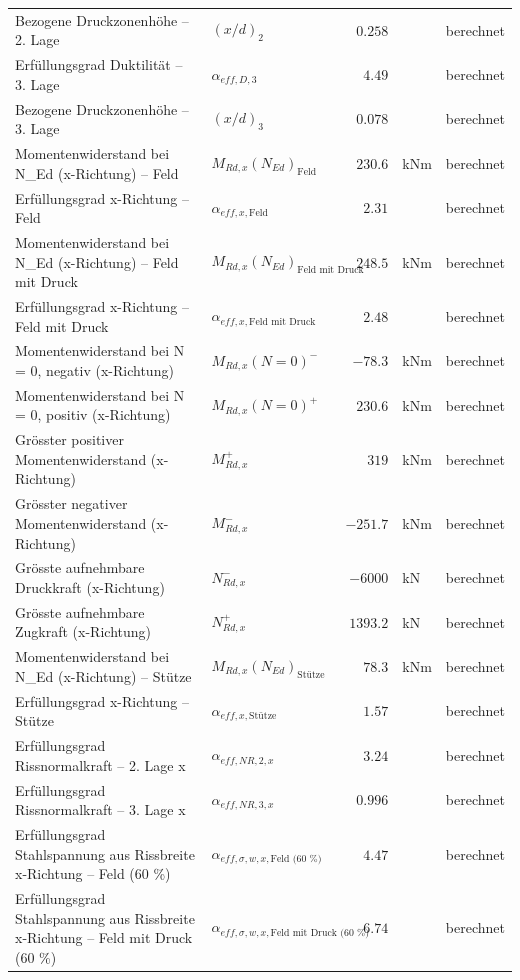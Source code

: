 \documentclass[11pt,a4paper]{article}
\begin{document}
\begin{xltabular}{\linewidth}{>{\raggedright\arraybackslash}Xlrll}
Bezogene Druckzonenhöhe – 2. Lage & $\left(x/d\right)_{2}$ & $0.258$ &  & berechnet \\
Erfüllungsgrad Duktilität – 3. Lage & $\alpha_{eff,D,3}$ & $4.49$ &  & berechnet \\
Bezogene Druckzonenhöhe – 3. Lage & $\left(x/d\right)_{3}$ & $0.078$ &  & berechnet \\
Momentenwiderstand bei N\_Ed (x-Richtung) – Feld & $M_{Rd,x}(N_{Ed})_{\text{Feld}}$ & $230.6$ & kNm & berechnet \\
Erfüllungsgrad x-Richtung – Feld & $\alpha_{eff,x,\text{Feld}}$ & $2.31$ &  & berechnet \\
Momentenwiderstand bei N\_Ed (x-Richtung) – Feld mit Druck & $M_{Rd,x}(N_{Ed})_{\text{Feld mit Druck}}$ & $248.5$ & kNm & berechnet \\
Erfüllungsgrad x-Richtung – Feld mit Druck & $\alpha_{eff,x,\text{Feld mit Druck}}$ & $2.48$ &  & berechnet \\
Momentenwiderstand bei N = 0, negativ (x-Richtung) & $M_{Rd,x}(N=0)^{-}$ & $-78.3$ & kNm & berechnet \\
Momentenwiderstand bei N = 0, positiv (x-Richtung) & $M_{Rd,x}(N=0)^{+}$ & $230.6$ & kNm & berechnet \\
Grösster positiver Momentenwiderstand (x-Richtung) & $M_{Rd,x}^{+}$ & $319$ & kNm & berechnet \\
Grösster negativer Momentenwiderstand (x-Richtung) & $M_{Rd,x}^{-}$ & $-251.7$ & kNm & berechnet \\
Grösste aufnehmbare Druckkraft (x-Richtung) & $N_{Rd,x}^{-}$ & $-6000$ & kN & berechnet \\
Grösste aufnehmbare Zugkraft (x-Richtung) & $N_{Rd,x}^{+}$ & $1393.2$ & kN & berechnet \\
Momentenwiderstand bei N\_Ed (x-Richtung) – Stütze & $M_{Rd,x}(N_{Ed})_{\text{Stütze}}$ & $78.3$ & kNm & berechnet \\
Erfüllungsgrad x-Richtung – Stütze & $\alpha_{eff,x,\text{Stütze}}$ & $1.57$ &  & berechnet \\
Erfüllungsgrad Rissnormalkraft – 2. Lage x & $\alpha_{eff,NR,2,x}$ & $3.24$ &  & berechnet \\
Erfüllungsgrad Rissnormalkraft – 3. Lage x & $\alpha_{eff,NR,3,x}$ & $0.996$ &  & berechnet \\
Erfüllungsgrad Stahlspannung aus Rissbreite x-Richtung – Feld (60 \%) & $\alpha_{eff,\sigma,w,x,\text{Feld (60 \%)}}$ & $4.47$ &  & berechnet \\
Erfüllungsgrad Stahlspannung aus Rissbreite x-Richtung – Feld mit Druck (60 \%) & $\alpha_{eff,\sigma,w,x,\text{Feld mit Druck (60 \%)}}$ & $6.74$ &  & berechnet \\

\end{xltabular}
\end{document}
